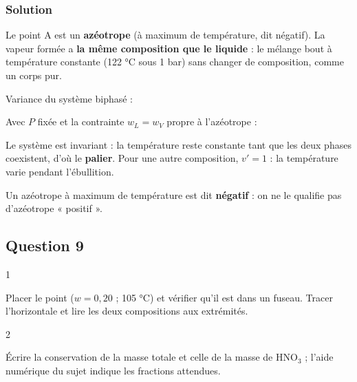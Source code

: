 \documentclass[11pt,a4paper]{article}
\newcommand{\equationajustee}[1]{%
  \sbox{\boiteequation}{$\displaystyle #1$}%
  \ifdim\wd\boiteequation>\linewidth
    \[\resizebox{\linewidth}{!}{\usebox{\boiteequation}}\]%
  \else
    \[#1\]%
  \fi}
\begin{document}
\hypertarget{solution-7}{%
\subsubsection{Solution}\label{solution-7}}

Le point A est un \textbf{azéotrope} (à maximum de température, dit négatif). La vapeur formée a \textbf{la même composition que le liquide} : le mélange bout à température constante (122 °C sous 1 bar) sans changer de composition, comme un corps pur.

Variance du système biphasé :

\equationajustee{\begin{aligned}
v&=c+2-\varphi\\
&=2
\end{aligned}}

Avec \(P\) fixée et la contrainte \(w_L=w_V\) propre à l'azéotrope :

\equationajustee{\boxed{v'=2-1-1=0}}

Le système est invariant : la température reste constante tant que les deux phases coexistent, d'où le \textbf{palier}. Pour une autre composition, \(v'=1\) : la température varie pendant l'ébullition.

\begin{piege}

Un azéotrope à maximum de température est dit \textbf{négatif} : on ne le qualifie pas d'azéotrope « positif ».

\end{piege}

\hypertarget{question-9}{%
\subsection{Question 9}\label{question-9}}

\begin{indication}{1}

Placer le point (\(w=0{,}20\) ; 105 °C) et vérifier qu'il est dans un fuseau. Tracer l'horizontale et lire les deux compositions aux extrémités.

\end{indication}

\begin{indication}{2}

Écrire la conservation de la masse totale et celle de la masse de HNO\(_3\) ; l'aide numérique du sujet indique les fractions attendues.

\end{indication}
\end{document}
